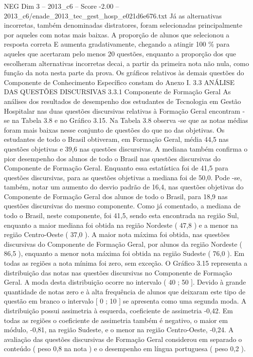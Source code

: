 \begin{textsample}{NEG Dim 3 – 2013\_c6 – Score -2.00 – 2013\_c6/enade\_2013\_tec\_gest\_hosp\_e021d6e676.txt}
Já as alternativas incorretas, também denominadas distratores, foram selecionadas principalmente por aqueles com notas mais baixas.
A proporção de alunos que selecionou a resposta correta E aumenta gradativamente, chegando a atingir 100 \% para aqueles que acertaram pelo menos 20 questões, enquanto a proporção dos que escolheram alternativas incorretas decai, a partir da primeira nota não nula, como função da nota nesta parte da prova.
Os gráficos relativos às demais questões do Componente de Conhecimento Específico constam do Anexo I. 3.3 ANÁLISE DAS QUESTÕES DISCURSIVAS 3.3.1 Componente de Formação Geral As análises dos resultados de desempenho dos estudantes de Tecnologia em Gestão Hospitalar nas duas questões discursivas relativas à Formação Geral encontram -se na Tabela 3.8 e no Gráfico 3.15.
Na Tabela 3.8 observa -se que as notas médias foram mais baixas nesse conjunto de questões do que no das objetivas.
Os estudantes de todo o Brasil obtiveram, em Formação Geral, média 44,5 nas questões objetivas e 39,6 nas questões discursivas.
A mediana também confirma o pior desempenho dos alunos de todo o Brasil nas questões discursivas do Componente de Formação Geral.
Enquanto essa estatística foi de 41,5 para questões discursivas, para as questões objetivas a mediana foi de 50,0.
Pode -se, também, notar um aumento do desvio padrão de 16,4, nas questões objetivas do Componente de Formação Geral dos alunos de todo o Brasil, para 18,9 nas questões discursivas do mesmo componente.
Como já comentado, a mediana de todo o Brasil, neste componente, foi 41,5, sendo esta encontrada na região Sul, enquanto a maior mediana foi obtida na região Nordeste ( 47,8 ) e a menor na região Centro-Oeste ( 37,0 ).
A maior nota máxima foi obtida, nas questões discursivas do Componente de Formação Geral, por alunos da região Nordeste ( 86,5 ), enquanto a menor nota máxima foi obtida na região Sudeste ( 76,0 ).
Em todas as regiões a nota mínima foi zero, sem exceção.
O Gráfico 3.15 representa a distribuição das notas nas questões discursivas no Componente de Formação Geral.
A moda desta distribuição ocorre no intervalo ( 40 ; 50 ].
Devido à grande quantidade de notas zero e à alta frequência de alunos que deixaram este tipo de questão em branco o intervalo [ 0 ; 10 ] se apresenta como uma segunda moda.
A distribuição possui assimetria à esquerda, coeficiente de assimetria -0,42.
Em todas as regiões o coeficiente de assimetria também é negativo, o maior em módulo, -0,81, na região Sudeste, e o menor na região Centro-Oeste, -0,24.
A avaliação das questões discursivas de Formação Geral considerou em separado o conteúdo ( peso 0,8 na nota ) e o desempenho em língua portuguesa ( peso 0,2 ).

\end{textsample}
